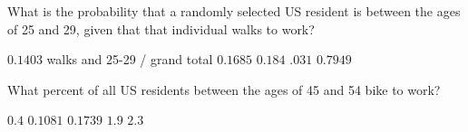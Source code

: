 \documentclass[answers,12pt]{exam}
\begin{document}
\begin{questions}
\question
What is the probability that a randomly selected US resident
is between the ages of 25 and 29, given that that individual
walks to work?\\
\begin{oneparchoices}
\choice $0.1403$ walks and 25-29 / grand total
\correctchoice $0.1685$
\choice $0.184$ %
\choice $.031$ %
\choice $0.7949$ %
\end{oneparchoices}

\question\label{LastWalk}
What percent of all US residents between the ages
of 45 and 54 bike to work?\\
\begin{oneparchoices}
\choice $0.4$
\choice $0.1081$ %
\choice $0.1739$ %
\choice $1.9$ %
\choice $2.3$ %
\end{oneparchoices}

\end{questions}
\end{document}
